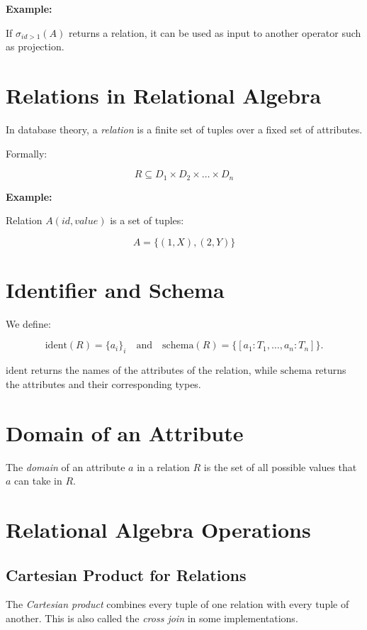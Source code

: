 \textbf{Example:}
  
If \(\sigma_{id > 1}(A)\) returns a relation, it can be used as input to another operator such as projection.

\section{Relations in Relational Algebra}

In database theory, a \emph{relation} is a finite set of tuples over a fixed set of attributes.

Formally:

\[
    R \subseteq D_1 \times D_2 \times \dots \times D_n
\]

\textbf{Example:}
  
Relation \(A(id, value)\) is a set of tuples:

\[
    A = \{(1, X), (2, Y)\}
\]

\section{Identifier and Schema}

We define:

\[
    \mathrm{ident}(R) = \{a_i\}_i \quad \text{and} \quad \mathrm{schema} (R) = \{[a_1:T_1, \dots, a_n:T_n]\}.
\]

\(\mathrm{ident}\) returns the names of the attributes of the relation, while \(\mathrm{schema}\) returns the attributes and their corresponding types.

\section{Domain of an Attribute}

The \emph{domain} of an attribute \(a\) in a relation \(R\) is the set of all possible values that \(a\) can take in \(R\).

\section{Relational Algebra Operations}

\subsection{Cartesian Product for Relations}

The \emph{Cartesian product} combines every tuple of one relation with every tuple of another.
This is also called the \emph{cross join} in some implementations.

